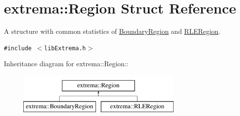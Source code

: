 \hypertarget{structextrema_1_1Region}{
\section{extrema::Region Struct Reference}
\label{structextrema_1_1Region}
}
A structure with common statistics of \hyperlink{structextrema_1_1BoundaryRegion}{Boundary\-Region} and \hyperlink{structextrema_1_1RLERegion}{RLERegion}.  


{\tt \#include $<$lib\-Extrema.h$>$}

Inheritance diagram for extrema::Region::\begin{figure}[H]
\begin{center}
\leavevmode
\includegraphics[height=2cm]{structextrema_1_1Region}
\end{center}
\end{figure}

